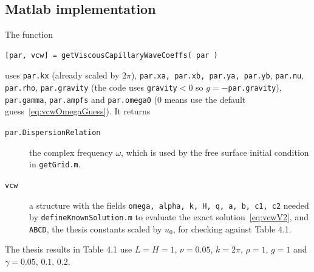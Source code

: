 \subsection{Matlab implementation} \label{sec:vcw_matlab}

The function
\begin{Verbatim}[fontsize=\small]
   [par, vcw] = getViscousCapillaryWaveCoeffs( par )
\end{Verbatim}
uses \texttt{par.kx} (already scaled by $2\pi$), \texttt{par.xa, par.xb, par.ya, par.yb}, \texttt{par.nu}, \texttt{par.rho}, \texttt{par.gravity}
(the code uses \texttt{gravity}$<0$ so $g=-$\texttt{par.gravity}), \texttt{par.gamma}, \texttt{par.ampfs} and \texttt{par.omega0}
($0$ means use the default guess~\eqref{eq:vcwOmegaGuess}). It returns
\begin{description}
   \item[\texttt{par.DispersionRelation}] the complex frequency $\omega$, which is used by the free surface initial condition in \texttt{getGrid.m}.
   \item[\texttt{vcw}] a structure with the fields \texttt{omega, alpha, k, H, q, a, b, c1, c2} needed by \texttt{defineKnownSolution.m} to evaluate the exact
     solution~\eqref{eq:vcwV2}, and \texttt{ABCD}, the thesis constants scaled by $u_0$, for checking against Table 4.1.
\end{description}
The thesis results in Table 4.1 use $L=H=1$, $\nu=0.05$, $k=2\pi$, $\rho=1$, $g=1$ and $\gamma=0.05,\,0.1,\,0.2$.

